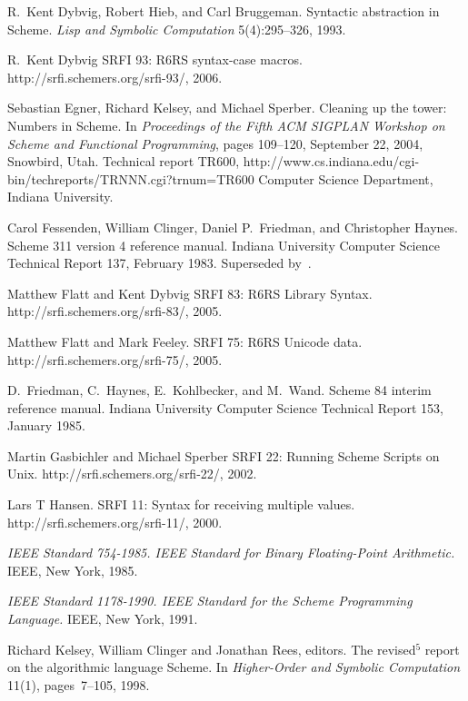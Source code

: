\begin{thebibliography}{999}
R.~Kent Dybvig, Robert Hieb, and Carl Bruggeman.
Syntactic abstraction in Scheme.
{\em Lisp and Symbolic Computation} 5(4):295--326, 1993.

R.\ Kent Dybvig
SRFI 93: R6RS {\cf syntax-case} macros.
{\cf http://srfi.schemers.org/srfi-93/}, 2006.

Sebastian Egner, Richard Kelsey, and Michael Sperber.
Cleaning up the tower: Numbers in Scheme.
In {\em Proceedings of the Fifth ACM SIGPLAN
  Workshop on Scheme and Functional Programming},
pages 109--120,
September 22, 2004, Snowbird, Utah.
Technical report TR600,
{\cf http://www.cs.indiana.edu/\linebreak[1]cgi-bin/\linebreak[1]techreports/\linebreak[1]TRNNN.cgi?trnum=TR600}
Computer Science Department, Indiana University.

Carol Fessenden, William Clinger, Daniel P.~Friedman, and Christopher Haynes.
Scheme 311 version 4 reference manual.
Indiana University Computer Science Technical Report 137, February 1983.
Superseded by~\cite{Scheme84}.

Matthew Flatt and Kent Dybvig
SRFI 83: R6RS Library Syntax.
{\cf http://srfi.schemers.org/srfi-83/}, 2005.
 
Matthew Flatt and Mark Feeley.
SRFI 75: R6RS Unicode data.
{\cf http://srfi.schemers.org/srfi-75/}, 2005.

D.~Friedman, C.~Haynes, E.~Kohlbecker, and M.~Wand.
Scheme 84 interim reference manual.
Indiana University Computer Science Technical Report 153, January 1985.

Martin Gasbichler and Michael Sperber
SRFI 22: Running Scheme Scripts on Unix.
{\cf http://srfi.schemers.org/srfi-22/}, 2002.

Lars T Hansen.
SRFI 11: Syntax for receiving multiple values.
{\cf http://srfi.schemers.org/srfi-11/}, 2000.

{\em IEEE Standard 754-1985.  IEEE Standard for Binary Floating-Point
Arithmetic.}  IEEE, New York, 1985.

{\em IEEE Standard 1178-1990.  IEEE Standard for the Scheme
  Programming Language.}  IEEE, New York, 1991.

Richard Kelsey, William Clinger and Jonathan Rees, editors.
The revised$^5$ report on the algorithmic language Scheme.
In {\em Higher-Order and Symbolic Computation} 11(1), pages~7--105, 1998.


\end{thebibliography}
